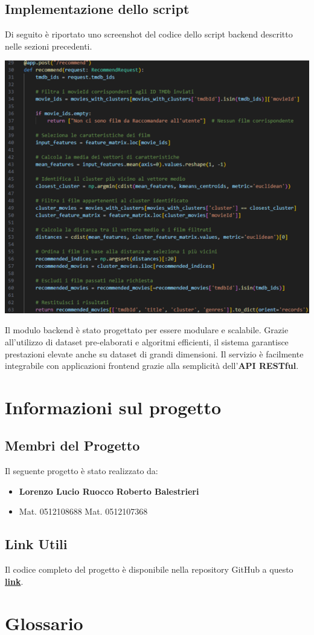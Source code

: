 \documentclass[a4paper,12pt]{article}
\begin{document}
\subsection{Implementazione dello script}
Di seguito è riportato uno screenshot del codice dello script backend descritto nelle sezioni precedenti.
\begin{center}
    \includegraphics[]{./grafici/backend.png}
\end{center}
Il modulo backend è stato progettato per essere modulare e scalabile. Grazie all'utilizzo di dataset pre-elaborati e algoritmi efficienti, il sistema garantisce prestazioni elevate anche su dataset di grandi dimensioni. Il servizio è facilmente integrabile con applicazioni frontend grazie alla semplicità dell'\textbf{API RESTful}.

\section{Informazioni sul progetto}
	\subsection{Membri del Progetto}
	Il seguente progetto è stato realizzato da:  
\begin{itemize}
\item[] \textbf{Lorenzo Lucio Ruocco}\hspace{2cm}
            \textbf{Roberto Balestrieri}
	\vspace{-0.5cm}
\item[] Mat. 0512108688 \hspace{3.4cm}
	  Mat. 0512107368
\end{itemize}
	\subsection{Link Utili}
Il codice completo del progetto è disponibile nella repository GitHub a questo \textcolor{blue}{\href{https://github.com/LRuocco22/NozApp/}{\textbf{{link}}}}.
\section{Glossario}
\end{document}
